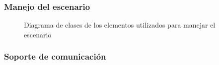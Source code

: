 \documentclass[a4paper]{article}
\begin{document}
\newpage

\subsubsection{Manejo del escenario}

\begin{figure}[!h]
	\caption{Diagrama de clases de los elementos utilizados para manejar el escenario}
	\label{fig:diagrama4}
\end{figure}

\newpage

\subsubsection{Soporte de comunicación}
\end{document}
